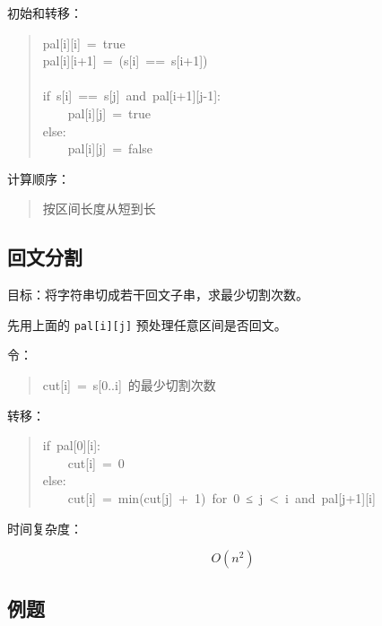 \documentclass[UTF8,zihao=-4]{ctexart}
\begin{document}
初始和转移：

\begin{quote}
\small\ttfamily\raggedright
\relax pal[i][i]\ =\ true\\
\relax pal[i][i+1]\ =\ (s[i]\ ==\ s[i+1])\\
\mbox{}\\
\relax if\ s[i]\ ==\ s[j]\ and\ pal[i+1][j-1]:\\
\relax \ \ \ \ pal[i][j]\ =\ true\\
\relax else:\\
\relax \ \ \ \ pal[i][j]\ =\ false\\
\end{quote}

计算顺序：

\begin{quote}
\small\ttfamily\raggedright
\relax 按区间长度从短到长\\
\end{quote}

\subsection*{回文分割}

目标：将字符串切成若干回文子串，求最少切割次数。

先用上面的 \texttt{pal[i][j]} 预处理任意区间是否回文。

令：

\begin{quote}
\small\ttfamily\raggedright
\relax cut[i]\ =\ s[0..i]\ 的最少切割次数\\
\end{quote}

转移：

\begin{quote}
\small\ttfamily\raggedright
\relax if\ pal[0][i]:\\
\relax \ \ \ \ cut[i]\ =\ 0\\
\relax else:\\
\relax \ \ \ \ cut[i]\ =\ min(cut[j]\ +\ 1)\ for\ 0\ ≤\ j\ <\ i\ and\ pal[j+1][i]\\
\end{quote}

时间复杂度：

\[O(n^{2})\]

\subsection*{例题}
\end{document}
